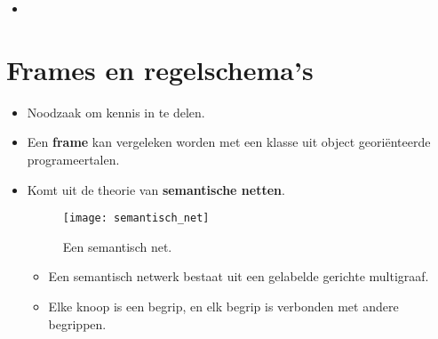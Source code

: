 \begin{itemize}
\begin{itemize}
\begin{enumerate}
\begin{itemize}
\begin{itemize}
					
				
					\item[] \noindent{} 
		
				\end{itemize}
			\end{itemize}
		\end{enumerate}	
	\end{itemize}
\end{itemize}

\section{Frames en regelschema's}
\begin{itemize}
	\item Noodzaak om kennis in te delen.
	\item Een \textbf{frame} kan vergeleken worden met een klasse uit object georiënteerde programeertalen.
	\item Komt uit de theorie van \textbf{semantische netten}.
	\begin{figure}
		\texttt{[image: semantisch\_net]}
		\caption{Een semantisch net.}
	\end{figure}
	\begin{itemize}
		\item Een semantisch netwerk bestaat uit een gelabelde gerichte multigraaf.
		\item Elke knoop is een begrip, en elk begrip is verbonden met andere begrippen.
	\end{itemize}
	
\end{itemize}